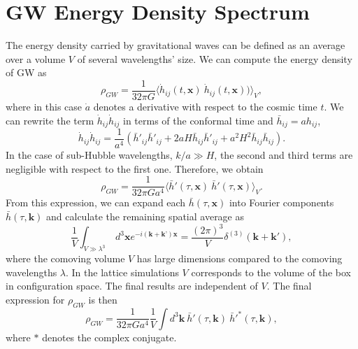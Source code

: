 \documentclass[11pt,a4paper,twoside]{book}
\begin{document}
\section{GW Energy Density Spectrum}
The energy density carried by  gravitational waves can be defined as an average over a volume $ V $ of several wavelengths' size. We can compute the energy density of GW as 
\begin{equation}
\label{Chap7:energyDensityGWs}
\rho_{GW}=\frac{1}{32\pi G}\langle \dot{h}_{ij}(t,\textbf{x})\ \dot{h}_{ij}(t,\textbf{x}))\rangle _{V},
\end{equation}
where in this case $ \dot{a} $ denotes a derivative with respect to the cosmic time $ t $. We can rewrite the term $ \dot{h}_{ij}\dot{h}_{ij} $ in terms of the conformal time and $ \bar{h}_{ij}= a h_{ij} $,
\begin{equation}
\label{Chap7:hConformalTime}
\dot{h}_{ij} \dot{h}_{ij} = \frac{1}{a^{4}}(\bar{h}'_{ij} \bar{h}'_{ij} + 2aH \bar{h}_{ij} \bar{h}'_{ij}+ a^{2}H^{2} \bar{h}_{ij} \bar{h}_{ij}).
\end{equation}
In the case of sub-Hubble wavelengths, $ k/a \gg H $,  the second and third terms are negligible with respect to the first one. Therefore, we obtain
\begin{equation}
\label{Chap7:energyDensity2}
\rho_{GW} = \frac{1}{32\pi G a^{4}} \langle \bar{h}'(\tau,\textbf{x})\ \bar{h}'(\tau,\textbf{x})\rangle _{V}.
\end{equation}
From this expression, we can expand each $ \bar{h}(\tau,\textbf{x}) $ into Fourier components $ \bar{h}(\tau,\textbf{k}) $ and calculate the remaining spatial average as
\begin{equation}
\label{Chap7:spatialAverage}
\frac{1}{V}\int_{V \gg \lambda^{3}}\ d^{3}\textbf{x}e^{-i(\textbf{k} + \textbf{k'})\textbf{x}} = \frac{(2\pi)^{3}}{V}\delta^{(3)}(\textbf{k} + \textbf{k}'),
\end{equation}
where the comoving volume $ V $ has large dimensions compared to the comoving wavelengths $\lambda$. In the lattice simulations $ V $ corresponds to the volume of the box in configuration space. The final results are independent of $ V $. The final expression for $\rho_{GW}$ is then
\begin{equation}
\label{Chap7:energyDensity}
\rho_{GW}=\frac{1}{32\pi G a^{4}}\frac{1}{V}\int d^{3}\textbf{k}\ \bar{h}'(\tau,\textbf{k})\ \bar{h}'^{*}(\tau,\textbf{k}),
\end{equation}
where $*$ denotes the complex conjugate.
\end{document}
